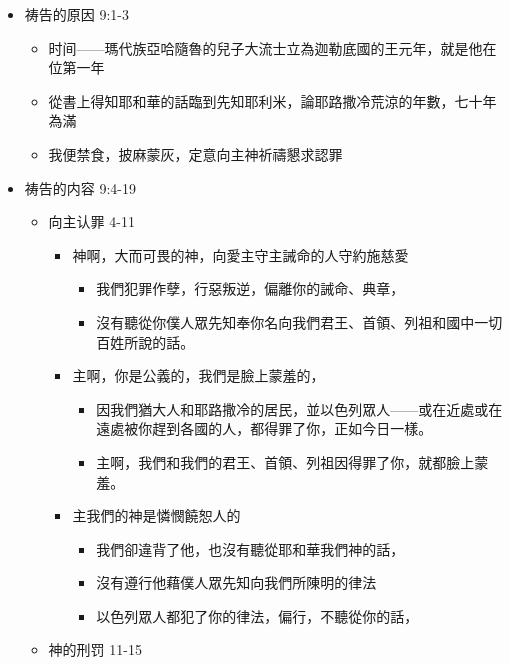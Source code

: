 \begin{itemize}
\itemsep-.45em  
\item 祷告的原因 9:1-3
\begin{itemize}
\itemsep-.45em  
\item 时间——瑪代族亞哈隨魯的兒子大流士立為迦勒底國的王元年，就是他在位第一年
\item 從書上得知耶和華的話臨到先知耶利米，論耶路撒冷荒涼的年數，七十年為滿
\item 我便禁食，披麻蒙灰，定意向主神祈禱懇求認罪
\end{itemize}

\item 祷告的内容 9:4-19 
\begin{itemize}
\itemsep-.45em  
\item 向主认罪 4-11
\begin{itemize}
\itemsep-.45em  
\item 神啊，大而可畏的神，向愛主守主誡命的人守約施慈愛
\begin{itemize}
\itemsep-.45em  
\item 我們犯罪作孽，行惡叛逆，偏離你的誡命、典章， 
\item 沒有聽從你僕人眾先知奉你名向我們君王、首領、列祖和國中一切百姓所說的話。
 \end{itemize}
\item 主啊，你是公義的，我們是臉上蒙羞的，
\begin{itemize}
\itemsep-.45em  
\item 因我們猶大人和耶路撒冷的居民，並以色列眾人——或在近處或在遠處被你趕到各國的人，都得罪了你，正如今日一樣。 
\item 主啊，我們和我們的君王、首領、列祖因得罪了你，就都臉上蒙羞。
\end{itemize}
\item 主我們的神是憐憫饒恕人的
\begin{itemize}
\itemsep-.45em  
\item 我們卻違背了他，也沒有聽從耶和華我們神的話，
\item 沒有遵行他藉僕人眾先知向我們所陳明的律法
\item 以色列眾人都犯了你的律法，偏行，不聽從你的話，
\end{itemize}
\end{itemize}
\item 神的刑罚 11-15
\begin{itemize}

\end{itemize}
\end{itemize}
\end{itemize}
